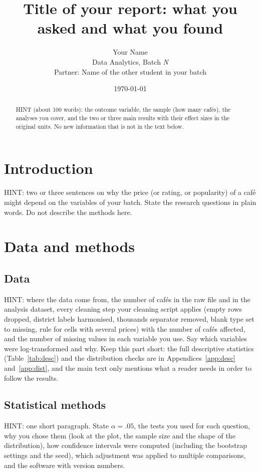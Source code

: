 \documentclass[11pt,a4paper]{article}
\title{\textbf{Title of your report: what you asked and what you found}}
\author{Your Name\\[0.3ex]\small Data Analytics, Batch \textit{N}\\[0.3ex]\small Partner: Name of the other student in your batch}
\date{\today}
\begin{document}
\maketitle

\begin{abstract}
\noindent HINT (about 100 words): the outcome variable, the sample (how many caf\'es), the analyses you cover, and the two or three main results with their effect sizes in the original units. No new information that is not in the text below.
\end{abstract}

\section{Introduction}
HINT: two or three sentences on why the price (or rating, or popularity) of a caf\'e might depend on the variables of your batch. State the research questions in plain words. Do not describe the methods here.

\section{Data and methods}

\subsection{Data}
HINT: where the data come from, the number of caf\'es in the raw file and in the analysis dataset, every cleaning step your cleaning script applies (empty rows dropped, district labels harmonised, thousands separator removed, blank type set to missing, rule for cells with several prices) with the number of caf\'es affected, and the number of missing values in each variable you use. Say which variables were log-transformed and why. Keep this part short: the full descriptive statistics (Table~\ref{tab:desc}) and the distribution checks are in Appendices~\ref{app:desc} and~\ref{app:dist}, and the main text only mentions what a reader needs in order to follow the results.

\subsection{Statistical methods}
HINT: one short paragraph. State $\alpha=.05$, the tests you used for each question, why you chose them (look at the plot, the sample size and the shape of the distribution), how confidence intervals were computed (including the bootstrap settings and the seed), which adjustment was applied to multiple comparisons, and the software with version numbers.
\end{document}
